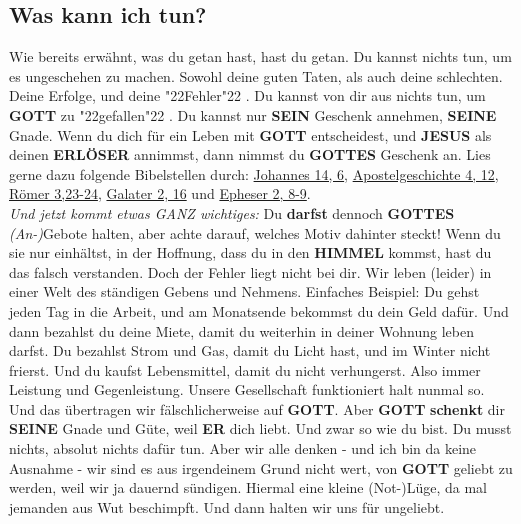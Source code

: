 \documentclass[10pt,a5paper]{article}
\newcommand{\Erloeser}[0]{\textbf{ERL\"OSER}}
\newcommand{\Er}[0]{\textbf{ER}}
\newcommand{\Gottes}[0]{\textbf{GOTTES}}
\newcommand{\Gott}[0]{\textbf{GOTT}}
\newcommand{\Himmel}[0]{\textbf{HIMMEL}}
\newcommand{\Jesus}[0]{\textbf{JESUS}}
\newcommand{\Seine}[0]{\textbf{SEINE}}
\newcommand{\Sein}[0]{\textbf{SEIN}}
\newcommand{\q}[1]{\char"22{#1}\char"22 }
\begin{document}
	\subsection{Was kann ich tun?}
		Wie bereits erw\"ahnt,
		was du getan hast,
		hast du getan.
		Du kannst nichts tun,
		um es ungeschehen zu machen.
		Sowohl deine guten Taten,
		als auch deine schlechten.
		Deine Erfolge,
		und deine \q{Fehler}.
		Du kannst von dir aus nichts tun,
		um {\Gott} zu \q{gefallen}.
		Du kannst nur {\Sein} Geschenk annehmen,
		{\Seine} Gnade.
		Wenn du dich f\"ur ein Leben mit {\Gott} entscheidest,
		und {\Jesus} als deinen {\Erloeser} annimmst,
		dann nimmst du {\Gottes} Geschenk an.
		Lies gerne dazu folgende Bibelstellen durch:
		\href{https://www.die-bibel.de/bibeln/online-bibeln/lesen/LU17/JHN.14/Johannes-14}{Johannes 14, 6},
		\href{https://www.die-bibel.de/bibeln/online-bibeln/lesen/LU17/ACT.4/Apostelgeschichte-4}{Apostelgeschichte 4, 12},
		\href{https://www.die-bibel.de/bibeln/online-bibeln/lesen/LU17/ROM.3/Römer-3}{R\"omer 3,23-24},
		\href{https://www.die-bibel.de/bibeln/online-bibeln/lesen/LU17/GAL.2/Galater-2}{Galater 2, 16} und \href{https://www.die-bibel.de/bibeln/online-bibeln/lesen/LU17/EPH.2/Epheser-2}{Epheser 2, 8-9}.
		\\
		\textit{Und jetzt kommt etwas GANZ wichtiges:}
		Du \textbf{darfst} dennoch {\Gottes} \textit{(An-)}Gebote halten,
		aber achte darauf,
		welches Motiv dahinter steckt!
		Wenn du sie nur einh\"altst,
		in der Hoffnung,
		dass du in den {\Himmel} kommst,
		hast du das falsch verstanden.
		Doch der Fehler liegt nicht bei dir.
		Wir leben (leider) in einer Welt des st\"andigen Gebens und Nehmens.
		Einfaches Beispiel:
		Du gehst jeden Tag in die Arbeit,
		und am Monatsende bekommst du dein Geld daf\"ur.
		Und dann bezahlst du deine Miete,
		damit du weiterhin in deiner Wohnung leben darfst.
		Du bezahlst Strom und Gas,
		damit du Licht hast,
		und im Winter nicht frierst.
		Und du kaufst Lebensmittel,
		damit du nicht verhungerst.
		Also immer Leistung und Gegenleistung.
		Unsere Gesellschaft funktioniert halt nunmal so.
		Und das \"ubertragen wir f\"alschlicherweise auf {\Gott}.
		Aber {\Gott} \textbf{schenkt} dir {\Seine} Gnade und G\"ute,
		weil {\Er} dich liebt.
		Und zwar so wie du bist.
		Du musst nichts,
		absolut nichts daf\"ur tun.
		Aber wir alle denken
		- und ich bin da keine Ausnahme
		- wir sind es aus irgendeinem Grund nicht wert,
		von {\Gott} geliebt zu werden,
		weil wir ja dauernd s\"undigen.
		Hiermal eine kleine (Not-)L\"uge,
		da mal jemanden aus Wut beschimpft.
		Und dann halten wir uns f\"ur ungeliebt.
\end{document}
